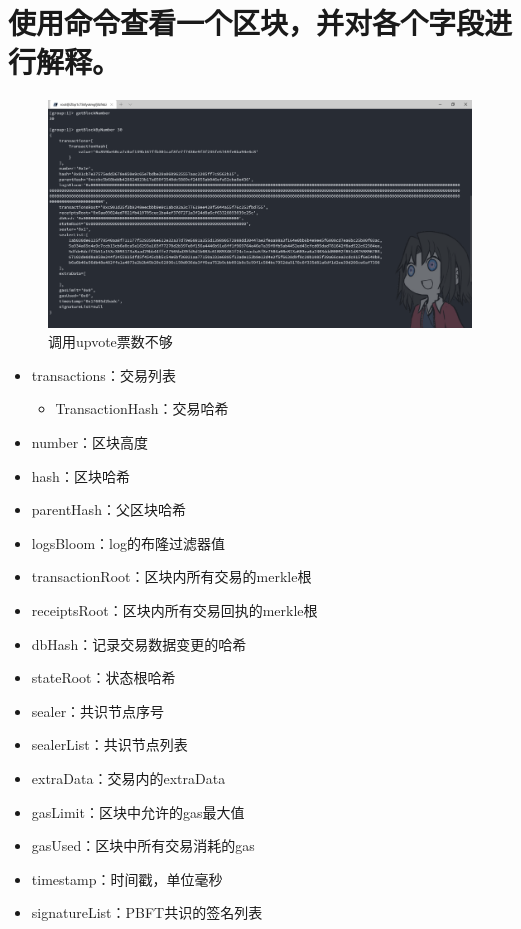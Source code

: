 \documentclass[a4paper, 11pt]{article}
\begin{document}
\section{使用命令查看一个区块，并对各个字段进行解释。}
\begin{figure}[H]
      \centering
      \includegraphics[width = 0.8 \textwidth]{block.png}
      \caption{调用upvote票数不够}
\end{figure}
\begin{itemize}
      \item transactions：交易列表
      \begin{itemize}
            \item TransactionHash：交易哈希
      \end{itemize}
      \item number：区块高度
      \item hash：区块哈希
      \item parentHash：父区块哈希
      \item logsBloom：log的布隆过滤器值
      \item transactionRoot：区块内所有交易的merkle根
      \item receiptsRoot：区块内所有交易回执的merkle根
      \item dbHash：记录交易数据变更的哈希
      \item stateRoot：状态根哈希
      \item sealer：共识节点序号
      \item sealerList：共识节点列表
      \item extraData：交易内的extraData
      \item gasLimit：区块中允许的gas最大值
      \item gasUsed：区块中所有交易消耗的gas
      \item timestamp：时间戳，单位毫秒
      \item signatureList：PBFT共识的签名列表
\end{itemize}
\end{document}
